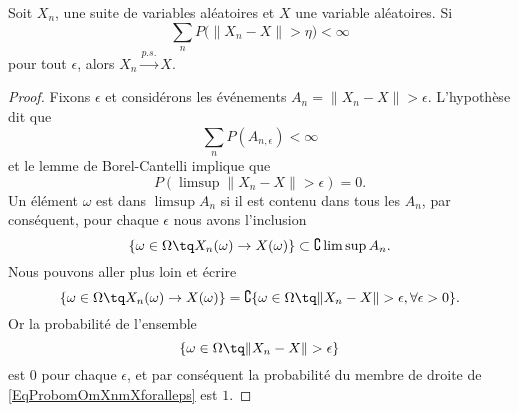 \begin{proposition}
    Soit \( X_n\), une suite de variables aléatoires et \( X\) une variable aléatoires. Si
    \begin{equation}
        \sum_nP\big( \| X_n-X \|>\eta \big)<\infty
    \end{equation}
    pour tout \( \epsilon\), alors \( X_n\stackrel{p.s.}{\longrightarrow}X\).
\end{proposition}

\begin{proof}
    Fixons \( \epsilon\) et considérons les événements \( A_{n}=\| X_n-X \|>\epsilon\). L'hypothèse dit que
    \begin{equation}
        \sum_nP(A_{n,\epsilon})<\infty
    \end{equation}
    et le lemme de Borel-Cantelli implique que
    \begin{equation}
        P(\limsup\| X_n-X \|>\epsilon)=0.
    \end{equation}
    Un élément \( \omega\) est dans \( \limsup A_n\) si il est contenu dans tous les \( A_n\), par conséquent, pour chaque \( \epsilon\) nous avons l'inclusion
    \begin{equation}
        \{ \omega\in\Omega\tq X_n(\omega)\to X(\omega) \}\subset\complement\limsup A_n.
    \end{equation}
    Nous pouvons aller plus loin et écrire
    \begin{equation}        \label{EqProbomOmXnmXforalleps}
        \{ \omega\in\Omega\tq X_n(\omega)\to X(\omega) \}=\complement\{ \omega\in\Omega\tq \| X_n-X \|>\epsilon,\forall\epsilon>0 \}.
    \end{equation}
    Or la probabilité de l'ensemble
    \begin{equation}
        \{ \omega\in\Omega\tq\| X_n-X \|>\epsilon \}
    \end{equation}
    est \( 0\) pour chaque \( \epsilon\), et par conséquent la probabilité du membre de droite de \eqref{EqProbomOmXnmXforalleps} est \( 1\).
\end{proof}

